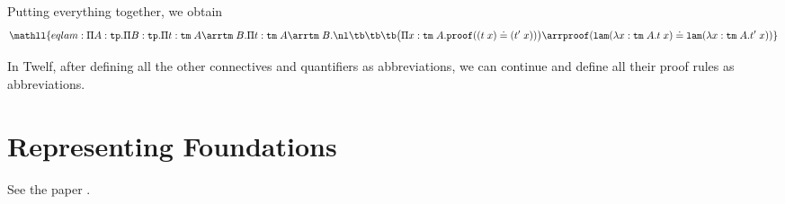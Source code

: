 Putting everything together, we obtain
\[\mathll{eqlam:
     \P{A}{\Type}\P{B}{\Type}\P{t}{\Term\;A\arr\Term\;B}\P{t}{\Term\;A\arr\Term\;B} \nl
  \tb\tb\tb
        \big(\P{x}{\Term\;A}\PROOF((t\;x)\doteq(t'\;x))\big)\arr
        \PROOF(\Lam(\lam{x}{\Term\;A}t\;x) \doteq \Lam(\lam{x}{\Term\;A}t'\;x))
}\]

In Twelf, after defining all the other connectives and quantifiers as abbreviations, we can continue and define all their proof rules as abbreviations.

\section{Representing Foundations}

See the paper \cite{IR:foundations:10}.
